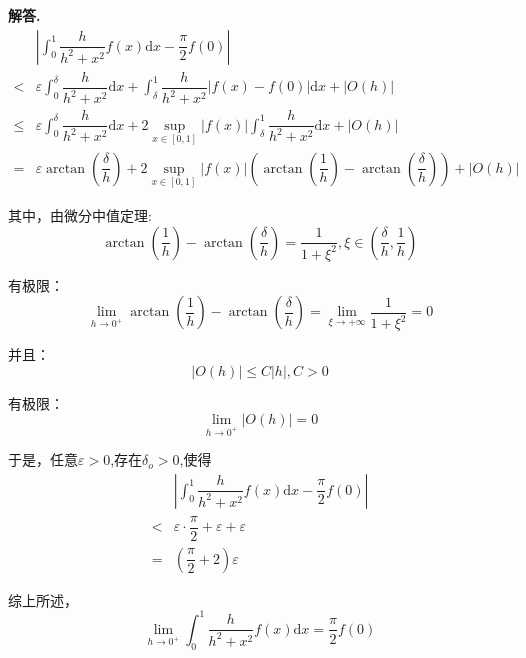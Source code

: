 \documentclass[12pt, a4paper, oneside]{ctexart}
\newenvironment{solution}{\par\noindent\textbf{解答. }}{\par}
\begin{document}
\begin{solution}
$$
\begin{aligned}
 &\left|\int_{0}^{1}\dfrac{h}{h^2+x^2}f(x)\mathrm{d}x-\dfrac{\pi}{2}f(0) \right|\\
 < & \varepsilon\int_{0}^{\delta}\dfrac{h}{h^2+x^2}\mathrm{d}x+
 \int_{\delta}^{1}\dfrac{h}{h^2+x^2}|f(x)-f(0)|\mathrm{d}x+|O(h)|\\
 \leqslant &\varepsilon\int_{0}^{\delta}\dfrac{h}{h^2+x^2}\mathrm{d}x+
 2\sup_{x \in[0,1]}|f(x)|\int_{\delta}^{1}\dfrac{h}{h^2+x^2}\mathrm{d}x+|O(h)|\\
 =&\varepsilon \arctan\left(\dfrac{\delta}{h}\right)+2\sup_{x\in[0,1]}|f(x)|\left(\arctan\left(\dfrac{1}{h}\right)
 -\arctan\left(\dfrac{\delta}{h}\right)\right)+|O(h)|
\end{aligned}
$$
\par
其中，由微分中值定理:
$$
\arctan\left(\dfrac{1}{h}\right)-\arctan\left(\dfrac{\delta}{h}\right)
=\dfrac{1}{1+\xi^2}, \xi \in\left(\dfrac{\delta}{h},\dfrac{1}{h}\right)
$$
\par
有极限：
$$
\lim_{h \to 0^+}\arctan\left(\dfrac{1}{h}\right)-\arctan\left(\dfrac{\delta}{h}\right)
=\lim_{\xi \to +\infty}\dfrac{1}{1+\xi^2}=0
$$
\par
并且：
$$
|O(h)|\leqslant C|h|, C>0
$$
\par
有极限：
$$
\lim_{h \to 0^+}|O(h)|=0
$$
\par
于是，任意$\varepsilon>0$,存在$\delta_o>0$,使得
$$
\begin{aligned}
&\left|\int_{0}^{1}\dfrac{h}{h^2+x^2}f(x)\mathrm{d}x-\dfrac{\pi}{2}f(0) \right|\\
 < & \varepsilon \cdot \dfrac{\pi}{2}+\varepsilon+\varepsilon\\
 =&\left(\dfrac{\pi}{2}+2\right)\varepsilon
\end{aligned}
 $$
\par
综上所述，$$
\lim_{h \to 0^+}\int_0^1\dfrac{h}{h^2+x^2}f(x)\mathrm{d}x=\dfrac{\pi}{2}f(0)
$$

\end{solution}
\end{document}

